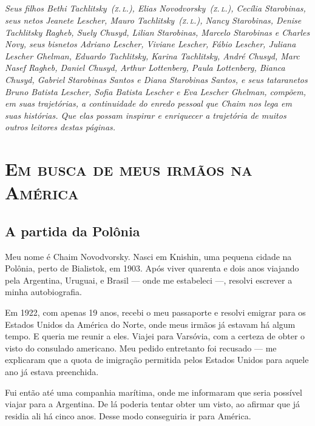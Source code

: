 \chapter*{}
\thispagestyle{empty}

\vfill
\begin{flushright}
\small
\textit{Seus filhos Bethi Tachlitsky~(\textsc{z.\,l.}), Elias Novodvorsky~(\textsc{z.\,l.}), Cecília Starobinas, seus netos Jeanete Lescher, Mauro Tachlitsky~(\textsc{z.\,l.}), Nancy Starobinas, Denise Tachlitsky Ragheb, Suely Chusyd, Lilian Starobinas, Marcelo Starobinas e Charles Novy, seus bisnetos Adriano Lescher, Viviane Lescher, Fábio Lescher, Juliana Lescher Ghelman, Eduardo Tachlitsky, Karina Tachlitsky, André Chusyd, Marc Nasef Ragheb, Daniel Chusyd, Arthur Lottenberg, Paula Lottenberg, Bianca Chusyd, Gabriel Starobinas Santos e Diana Starobinas Santos, e seus tataranetos Bruno Batista Lescher, Sofia Batista Lescher e Eva Lescher Ghelman, compõem, em suas trajetórias, a continuidade do enredo pessoal que Chaim nos lega em suas histórias. Que elas possam inspirar e enriquecer a trajetória de muitos outros leitores destas páginas.} 
\end{flushright}

\part[Em busca de meus irmãos na América]{\textsc{Em busca de meus irmãos na América}}
\chapter{A partida da Polônia}

Meu nome é Chaim Novodvorsky. Nasci em Knishin, uma pequena cidade na
Polônia, perto de Bialistok, em 1903. Após viver quarenta e dois anos viajando pela
Argentina, Uruguai, e Brasil --- onde me estabeleci ---, resolvi escrever a minha
autobiografia.


Em 1922, com apenas 19 anos, recebi o meu passaporte e resolvi emigrar
para os Estados Unidos da América do Norte, onde meus irmãos já estavam
há algum tempo. E queria me reunir a eles. Viajei para Varsóvia, com
a certeza de obter o visto do consulado americano. Meu pedido entretanto foi recusado --- me explicaram 
que a quota de imigração permitida pelos Estados Unidos para 
aquele ano já estava preenchida.

Fui então até uma companhia marítima, onde me informaram que seria possível
viajar para a Argentina. De lá poderia tentar obter um visto, ao afirmar que já residia ali há cinco anos. Desse modo conseguiria ir para América.

